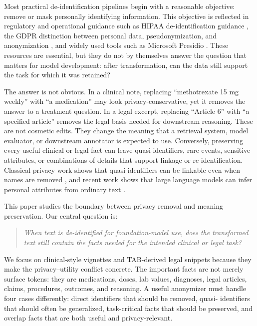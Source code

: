 \documentclass{article}
\begin{document}
Most practical de-identification pipelines begin with a reasonable objective:
remove or mask personally identifying information.  This objective is reflected
in regulatory and operational guidance such as HIPAA de-identification guidance
\cite{hhsdeid}, the GDPR distinction between personal data, pseudonymization, and
anonymization \cite{gdpr}, and widely used tools such as Microsoft Presidio
\cite{presidio}.  These resources are essential, but they do not by themselves
answer the question that matters for model development: after transformation,
can the data still support the task for which it was retained?

The answer is not obvious.  In a clinical note, replacing ``methotrexate 15 mg
weekly'' with ``a medication'' may look privacy-conservative, yet it removes the
answer to a treatment question.  In a legal excerpt, replacing ``Article 6'' with
``a specified article'' removes the legal basis needed for downstream reasoning.
These are not cosmetic edits.  They change the meaning that a retrieval system,
model evaluator, or downstream annotator is expected to use.  Conversely,
preserving every useful clinical or legal fact can leave quasi-identifiers, rare
events, sensitive attributes, or combinations of details that support linkage or
re-identification.  Classical privacy work shows that quasi-identifiers can be
linkable even when names are removed \cite{sweeney2002kanonymity,narayanan2008robust},
and recent work shows that large language models can infer personal attributes
from ordinary text \cite{staab2023beyond}.

This paper studies the boundary between privacy removal and meaning preservation.
Our central question is:
\begin{quote}
\emph{When text is de-identified for foundation-model use, does the transformed
text still contain the facts needed for the intended clinical or legal task?}
\end{quote}
We focus on clinical-style vignettes and TAB-derived legal snippets because they
make the privacy--utility conflict concrete.  The important facts are not merely
surface tokens: they are medications, doses, lab values, diagnoses, legal
articles, claims, procedures, outcomes, and reasoning.  A useful anonymizer must
handle four cases differently: direct identifiers that should be removed, quasi-
identifiers that should often be generalized, task-critical facts that should be
preserved, and overlap facts that are both useful and privacy-relevant.
\end{document}
